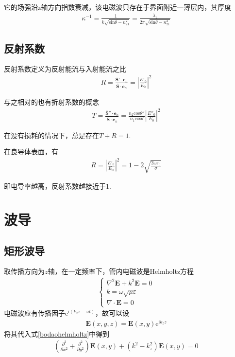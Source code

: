 \documentclass[main.tex]{subfiles}
\begin{document}
它的场强沿z轴方向指数衰减，该电磁波只存在于界面附近一薄层内，其厚度
\begin{align}
    \kappa ^{-1} = \frac{1}{k\sqrt{\mathrm{sin}\theta - n_{21}^2}} = \frac{\lambda _1}{2\pi \sqrt{\mathrm{sin} \theta - n_{21}^2}}
\end{align}

\subsection{反射系数}
反射系数定义为反射能流与入射能流之比
\begin{align}
    R = \frac{\bar{\boldsymbol{S}}' \cdot \boldsymbol{e}_n}{\bar{\boldsymbol{S}} \cdot \boldsymbol{e}_n} = \left|\frac{E'_0}{E_0}\right|^2
\end{align}

与之相对的也有折射系数的概念
\begin{align}
    T = \frac{\bar{\boldsymbol{S}}'' \cdot \boldsymbol{e}_n}{\bar{\boldsymbol{S}} \cdot \boldsymbol{e}_n} = \frac{n_2 \mathrm{cos}\theta ''}{n_1 \mathrm{cos}\theta }\left|\frac{E''_0}{E_0}\right|^2
\end{align}

在没有损耗的情况下，总是存在$T + R = 1$.

在良导体表面，有
\begin{align}
    R = \left|\frac{E'_0}{E_0}\right|^2 = 1-2\sqrt{\frac{2\omega \varepsilon _0}{\sigma}}
\end{align}

即电导率越高，反射系数越接近于1.

\section{波导}
\subsection{矩形波导}
取传播方向为$z$轴，在一定频率下，管内电磁波是Helmholtz方程
\begin{align}
    \label{bodaohelmholtz}\left\{\begin{array}{l}
    \nabla ^2 \boldsymbol{E} + k^2 \boldsymbol{E} = 0\\
    k = \displaystyle \omega \sqrt{\mu \varepsilon}\\
    \nabla \cdot \boldsymbol{E} = 0
    \end{array}\right.
\end{align}
电磁波应有传播因子$\mathrm{e}^{\mathrm{i}(k_z z-\omega t)}$，故可以设
\begin{align}
    \boldsymbol{E}(x,y,z) = \boldsymbol{E}(x,y) \mathrm{e}^{\mathrm{i} k_z z}
\end{align}
将其代入式\ref{bodaohelmholtz}中得到
\begin{align}
    \label{juxingbodao}\left(\frac{\partial ^2}{\partial x^2} + \frac{\partial ^2}{\partial y^2} \right)\boldsymbol{E}(x,y) + (k^2 - k^2_z) \boldsymbol{E}(x,y) = 0
\end{align}
\end{document}
